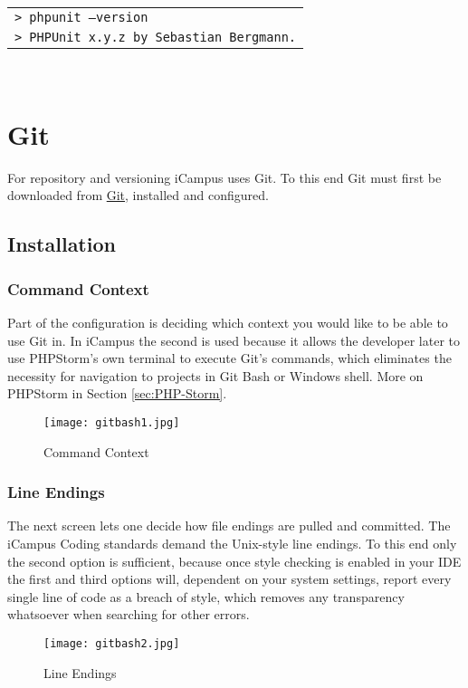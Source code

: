 \begin{tabular}{l}
	\texttt{> phpunit --version}\\
	\texttt{> PHPUnit x.y.z by Sebastian Bergmann.}
\end{tabular}\\
\newpage


\section{Git}

For repository and versioning iCampus uses Git. To this end Git must first be downloaded from \href{http://git-scm.com/downloads}{Git}, installed and configured.

\subsection{Installation}

\subsubsection{Command Context}
Part of the configuration is deciding which context you would like to be able to use Git in. In iCampus the second is used because it allows the developer later to use PHPStorm's own terminal to execute Git's commands, which eliminates the necessity for navigation to projects in Git Bash or Windows shell. More on PHPStorm in Section \ref{sec:PHP-Storm}.\\

\begin{figure}[h] 
	\centering
	\texttt{[image: gitbash1.jpg]}
	\caption{Command Context}
\end{figure}

\subsubsection{Line Endings}

The next screen lets one decide how file endings are pulled and committed. The iCampus Coding standards demand the Unix-style line endings. To this end only the second option is sufficient, because once style checking is enabled in your IDE the first and third options will, dependent on your system settings, report every single line of code as a breach of style, which removes any transparency whatsoever when searching for other errors.\\

\begin{figure}[h] 
	\centering
	\texttt{[image: gitbash2.jpg]}
	\caption{Line Endings}
\end{figure}

